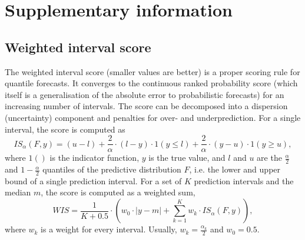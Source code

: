\documentclass[10pt,a4paper,twocolumn]{article}
\begin{document}
\appendix
\section*{Supplementary information}
\renewcommand{\thefigure}{SI.\arabic{figure}}
\setcounter{figure}{0}
\renewcommand{\thetable}{SI.\arabic{table}} \setcounter{table}{0}


\subsection*{Weighted interval score}
\label{sec:wis}

The weighted interval score (smaller values are better) is a proper scoring rule for quantile forecasts. It converges to the continuous ranked probability score (which itself is a generalisation of the absolute error to probabilistic forecasts) for an increasing number of intervals. The score can be decomposed into a dispersion (uncertainty) component and penalties for over- and underprediction. For a single interval, the score is computed as 
  $$IS_\alpha(F,y) = (u-l) + \frac{2}{\alpha} \cdot (l-y) \cdot 1(y \leq l) + \frac{2}{\alpha} \cdot (y-u) \cdot 1(y \geq u), $$ 
  where $1()$ is the indicator function, $y$ is the true value, and $l$ and $u$ are the $\frac{\alpha}{2}$ and $1 - \frac{\alpha}{2}$ quantiles of the predictive distribution $F$, i.e. the lower and upper bound of a single prediction interval. For a set of $K$ prediction intervals and the median $m$, the score is computed as a weighted sum, 
  $$WIS = \frac{1}{K + 0.5} \cdot \left( w_0 \cdot |y - m| + \sum_{k = 1}^{K} w_k \cdot IS_{\alpha}(F, y) \right), $$
  where $w_k$ is a weight for every interval. Usually, $w_k = \frac{\alpha_k}{2}$ and $w_0 = 0.5$. 
  


\end{document}
